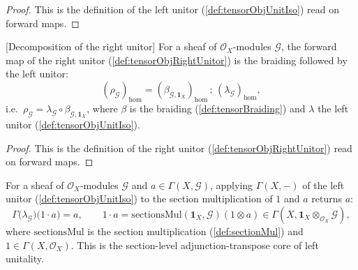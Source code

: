 \begin{proof}


  This is the definition of the left unitor (\cref{def:tensorObjUnitIso}) read on
  forward maps.
\end{proof}

\begin{lemma}



[Decomposition of the right unitor]
  \label{lem:tensorObjRightUnitor_hom}
  For a sheaf of \(\mathcal{O}_X\)-modules \(\mathcal{G}\), the forward map of the
  right unitor (\cref{def:tensorObjRightUnitor}) is the braiding followed by the
  left unitor:
  \[
    (\rho_{\mathcal{G}})_{\mathrm{hom}}
      = (\beta_{\mathcal{G},\mathbf{1}_X})_{\mathrm{hom}}
        \,;\, (\lambda_{\mathcal{G}})_{\mathrm{hom}},
  \]
  i.e.\ \(\rho_{\mathcal{G}} = \lambda_{\mathcal{G}} \circ
  \beta_{\mathcal{G},\mathbf{1}_X}\), where \(\beta\) is the braiding
  (\cref{def:tensorBraiding}) and \(\lambda\) the left unitor
  (\cref{def:tensorObjUnitIso}).
\end{lemma}

\begin{proof}


  This is the definition of the right unitor (\cref{def:tensorObjRightUnitor}) read
  on forward maps.
\end{proof}

\begin{lemma}
  \label{lem:sectionMul_unitor_core}
  For a sheaf of \(\mathcal{O}_X\)-modules \(\mathcal{G}\) and
  \(a \in \Gamma(X, \mathcal{G})\), applying \(\Gamma(X,-)\) of the left unitor
  (\cref{def:tensorObjUnitIso}) to the section multiplication of \(1\) and \(a\)
  returns \(a\):
  \[
    \Gamma\bigl(\lambda_{\mathcal{G}}\bigr)
      \bigl( 1 \cdot a \bigr) = a,
    \qquad
    1 \cdot a = \mathrm{sectionsMul}(\mathbf{1}_X, \mathcal{G})(1 \otimes a)
      \in \Gamma(X, \mathbf{1}_X \otimes_{\mathcal{O}_X} \mathcal{G}),
  \]
  where \(\mathrm{sectionsMul}\) is the section multiplication
  (\cref{def:sectionMul}) and \(1 \in \Gamma(X,\mathcal{O}_X)\). This is the
  section-level adjunction-transpose core of left unitality.
\end{lemma}

